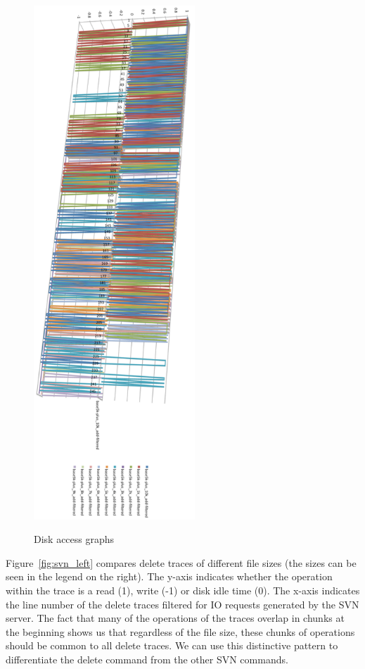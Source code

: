 \documentclass[11pt, oneside]{article}
\newcommand{\fref}[1]{Figure~\ref{#1}}
\begin{document}
\begin{figure}[H]
{	    \includegraphics[height=7.6in]{SVN_right.png}
	    \label{fig:svn_right}
	}
	\caption{Disk access graphs}
	\label{fig:svn_graphs}
\end{figure}

\fref{fig:svn_left} compares delete traces of different file sizes (the sizes 
can be seen in the legend on the right).  The y-axis indicates whether the 
operation within the trace is a read (1), write (-1) or disk idle time (0). 
The x-axis indicates the line number of the delete traces filtered for IO 
requests generated by the SVN server. The fact that many of the operations of 
the traces overlap in chunks at the beginning shows us that regardless of the 
file size, these chunks of operations should be common to all delete traces. 
We can use this distinctive pattern to differentiate the delete command from 
the other SVN commands.
\end{document}
